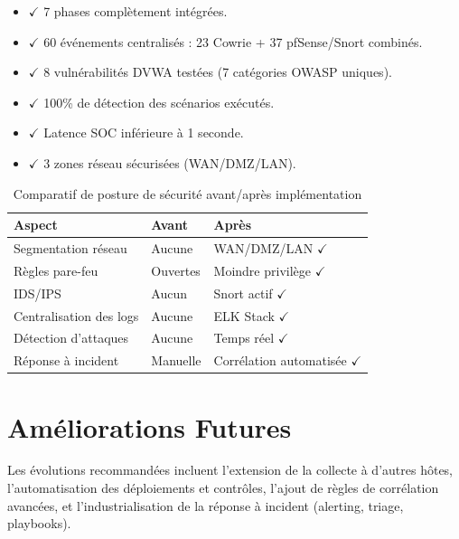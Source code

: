 \documentclass[12pt,a4paper,openany]{report}
\newcommand{\tableheadcolor}{\rowcolor{tableheadbg}}
\begin{document}
	\begin{tcolorbox}[colback=primary!5!white, colframe=primary, title=\textbf{PROJET FINAL — RÉSULTATS CLÉS}]
		\begin{itemize}[leftmargin=*, itemsep=2pt]
			\item $\checkmark$ 7 phases complètement intégrées.
			\item $\checkmark$ 60 événements centralisés : 23 Cowrie + 37 pfSense/Snort combinés.
			\item $\checkmark$ 8 vulnérabilités DVWA testées (7 catégories OWASP uniques).
			\item $\checkmark$ 100\% de détection des scénarios exécutés.
			\item $\checkmark$ Latence SOC inférieure à 1 seconde.
			\item $\checkmark$ 3 zones réseau sécurisées (WAN/DMZ/LAN).
		\end{itemize}
	\end{tcolorbox}
	
	\begin{table}[H]
		\centering
		\small
		\renewcommand{\arraystretch}{1.25}
		\setlength{\arrayrulewidth}{0.5pt}
		\begin{tabular}{p{4.3cm} p{3.2cm} p{4.2cm}}
			\arrayrulecolor{tableborder}
			\hline
			\tableheadcolor
			\textcolor{tableheadfg}{\textbf{Aspect}} &
			\textcolor{tableheadfg}{\textbf{Avant}} &
			\textcolor{tableheadfg}{\textbf{Après}} \\
			\hline
			\rowcolor{tablerowalt}
			Segmentation réseau & Aucune & WAN/DMZ/LAN $\checkmark$ \\
			Règles pare-feu & Ouvertes & Moindre privilège $\checkmark$ \\
			\rowcolor{tablerowalt}
			IDS/IPS & Aucun & Snort actif $\checkmark$ \\
			Centralisation des logs & Aucune & ELK Stack $\checkmark$ \\
			\rowcolor{tablerowalt}
			Détection d'attaques & Aucune & Temps réel $\checkmark$ \\
			Réponse à incident & Manuelle & Corrélation automatisée $\checkmark$ \\
			\hline
		\end{tabular}
		\caption{Comparatif de posture de sécurité avant/après implémentation}
		\label{tab:conclusion-posture-comparison}
	\end{table}
	
	\section{Améliorations Futures}
	Les évolutions recommandées incluent l'extension de la collecte à d'autres hôtes, l'automatisation des déploiements et contrôles, l'ajout de règles de corrélation avancées, et l'industrialisation de la réponse à incident (alerting, triage, playbooks).
	
\end{document}
